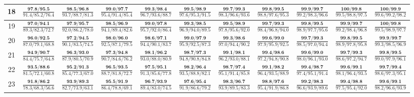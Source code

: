 \documentclass{slides}
\begin{document}
{{{\begin{tabular}{|c|c|c|c|c|c|c|c|c|c|c|}
\hline
18 & $\frac{\textbf{97.8/95.5}}{91.4/85.2/76.4}$ & $\frac{\textbf{98.5/96.8}}{93.7/88.7/81.3}$ & $\frac{\textbf{99.0/97.7}}{95.4/91.4/85.4}$ & $\frac{\textbf{99.3/98.4}}{96.7/93.6/88.7}$ & $\frac{\textbf{99.5/98.9}}{97.6/95.3/91.5}$ & $\frac{\textbf{99.7/99.3}}{98.3/96.6/93.6}$ & $\frac{\textbf{99.8/99.5}}{98.8/97.6/95.3}$ & $\frac{\textbf{99.9/99.7}}{99.2/98.3/96.6}$ & $\frac{\textbf{100/99.8}}{99.5/98.8/97.5}$ & $\frac{\textbf{100/99.9}}{99.6/99.2/98.2}$ \\
\hline
19 & $\frac{\textbf{97.0/94.1}}{89.3/82.3/72.7}$ & $\frac{\textbf{97.9/95.7}}{92.0/86.2/78.0}$ & $\frac{\textbf{98.5/96.9}}{94.1/89.4/82.6}$ & $\frac{\textbf{99.0/97.8}}{95.7/92.0/86.4}$ & $\frac{\textbf{99.3/98.5}}{96.9/94.0/89.5}$ & $\frac{\textbf{99.5/98.9}}{97.8/95.6/92.0}$ & $\frac{\textbf{99.7/99.3}}{98.4/96.8/94.0}$ & $\frac{\textbf{99.8/99.5}}{98.9/97.7/95.6}$ & $\frac{\textbf{99.9/99.7}}{99.2/98.4/96.8}$ & $\frac{\textbf{100/99.8}}{99.5/98.9/97.7}$ \\
\hline
20 & $\frac{\textbf{96.0/92.5}}{87.0/79.1/68.8}$ & $\frac{\textbf{97.2/94.5}}{90.1/83.5/74.5}$ & $\frac{\textbf{98.0/96.0}}{92.5/87.1/79.5}$ & $\frac{\textbf{98.6/97.1}}{94.4/90.1/83.7}$ & $\frac{\textbf{99.0/97.9}}{95.9/92.5/87.3}$ & $\frac{\textbf{99.3/98.6}}{97.0/94.4/90.2}$ & $\frac{\textbf{99.6/99.0}}{97.9/95.9/92.5}$ & $\frac{\textbf{99.7/99.3}}{98.5/97.0/94.4}$ & $\frac{\textbf{99.8/99.5}}{98.9/97.8/95.8}$ & $\frac{\textbf{99.9/99.7}}{99.3/98.5/96.9}$ \\
\hline
21 & $\frac{\textbf{94.9/90.7}}{84.4/75.7/64.8}$ & $\frac{\textbf{96.3/93.0}}{87.9/80.5/70.9}$ & $\frac{\textbf{97.3/94.8}}{90.7/84.6/76.2}$ & $\frac{\textbf{98.1/96.2}}{93.0/88.0/80.9}$ & $\frac{\textbf{98.7/97.3}}{94.8/90.8/84.8}$ & $\frac{\textbf{99.1/98.1}}{96.2/93.0/88.1}$ & $\frac{\textbf{99.4/98.6}}{97.2/94.8/90.8}$ & $\frac{\textbf{99.6/99.0}}{98.0/96.1/93.0}$ & $\frac{\textbf{99.7/99.3}}{98.6/97.2/94.7}$ & $\frac{\textbf{99.8/99.5}}{99.0/97.9/96.1}$ \\
\hline
22 & $\frac{\textbf{93.5/88.6}}{81.5/72.1/60.8}$ & $\frac{\textbf{95.2/91.3}}{85.4/77.3/67.0}$ & $\frac{\textbf{96.5/93.5}}{88.7/81.8/72.7}$ & $\frac{\textbf{97.5/95.1}}{91.3/85.6/77.8}$ & $\frac{\textbf{98.2/96.4}}{93.5/88.8/82.1}$ & $\frac{\textbf{98.7/97.4}}{95.1/91.4/85.8}$ & $\frac{\textbf{99.1/98.2}}{96.4/93.5/88.9}$ & $\frac{\textbf{99.4/98.7}}{97.4/95.1/91.4}$ & $\frac{\textbf{99.6/99.1}}{98.1/96.4/93.5}$ & $\frac{\textbf{99.7/99.4}}{98.6/97.3/95.1}$ \\
\hline
23 & $\frac{\textbf{91.8/86.2}}{78.3/68.3/56.6}$ & $\frac{\textbf{93.9/89.3}}{82.7/73.9/63.1}$ & $\frac{\textbf{95.5/91.9}}{86.4/78.8/69.1}$ & $\frac{\textbf{96.7/93.9}}{89.4/83.0/74.5}$ & $\frac{\textbf{97.6/95.4}}{91.9/86.6/79.2}$ & $\frac{\textbf{98.3/96.7}}{93.9/89.5/83.3}$ & $\frac{\textbf{98.8/97.6}}{95.4/91.9/86.8}$ & $\frac{\textbf{99.2/98.3}}{96.6/93.9/89.6}$ & $\frac{\textbf{99.4/98.8}}{97.5/95.4/92.0}$ & $\frac{\textbf{99.6/99.1}}{98.2/96.6/93.9}$ \\

\end{tabular}}}}
\end{document}
